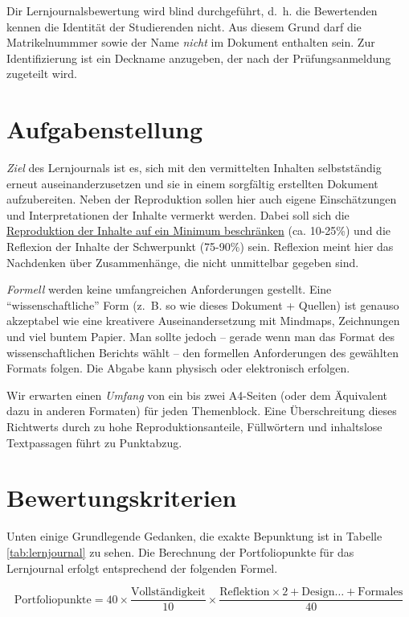 \documentclass[DIV=15,headinclude=true]{scrreprt}
\begin{document}
\begin{framed}
Dir Lernjournalsbewertung wird blind durchgeführt, d.\ h. die Bewertenden kennen die Identität der Studierenden nicht. Aus diesem Grund darf die Matrikelnummmer sowie der Name \emph{nicht} im Dokument enthalten sein. Zur Identifizierung ist ein Deckname anzugeben, der nach der Prüfungsanmeldung zugeteilt wird.
\end{framed}


\section{Aufgabenstellung}

\emph{Ziel} des Lernjournals ist es, sich mit den vermittelten Inhalten
selbstständig erneut auseinanderzusetzen und sie in einem sorgfältig
erstellten Dokument aufzubereiten. Neben der Reproduktion sollen hier
auch eigene Einschätzungen und Interpretationen der Inhalte vermerkt
werden. Dabei soll sich die \underline{Reproduktion der Inhalte auf ein Minimum
	beschränken} (ca. 10-25\%) und die Reflexion der Inhalte der Schwerpunkt
(75-90\%) sein. Reflexion meint hier das Nachdenken über Zusammenhänge,
die nicht unmittelbar gegeben sind.

\emph{Formell} werden keine umfangreichen Anforderungen gestellt. Eine
\enquote{wissenschaftliche} Form (z.~B. so wie dieses Dokument +
Quellen) ist genauso akzeptabel wie eine kreativere Auseinandersetzung
mit Mindmaps, Zeichnungen und viel buntem Papier. Man sollte jedoch -- gerade wenn man das Format des wissenschaftlichen Berichts wählt -- den formellen Anforderungen des gewählten Formats folgen. Die Abgabe kann
physisch oder elektronisch erfolgen.

Wir erwarten einen \emph{Umfang} von ein bis zwei A4-Seiten (oder dem
Äquivalent dazu in anderen Formaten) für jeden Themenblock. Eine Überschreitung dieses Richtwerts durch zu hohe Reproduktionsanteile, Füllwörtern und inhaltslose Textpassagen führt zu Punktabzug.

\section{Bewertungskriterien}

Unten einige Grundlegende Gedanken, die exakte Bepunktung ist in
Tabelle \ref{tab:lernjournal} zu sehen. Die Berechnung der Portfoliopunkte für das Lernjournal erfolgt entsprechend der folgenden Formel.

\begin{equation*}
	\text{Portfoliopunkte} = 40 \times \frac{\text{Vollständigkeit}}{10} \times \frac{\text{Reflektion} \times 2 + \text{Design…} + \text{Formales}}{40}
\end{equation*}
\end{document}
